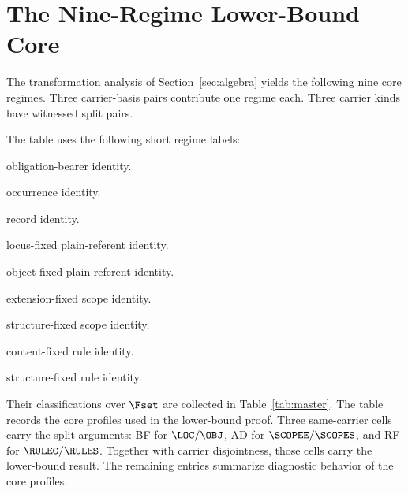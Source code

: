 
\section{The Nine-Regime Lower-Bound Core}
\label{sec:nine}

The transformation analysis of Section~\ref{sec:algebra}
yields the following nine core regimes.
Three carrier-basis pairs contribute one regime each.
Three carrier kinds have witnessed split pairs.

The table uses the following short regime labels:

\begin{description}[style=nextline,leftmargin=2.5cm]
  \item[$\OBL$] obligation-bearer identity.
  \item[$\OCC$] occurrence identity.
  \item[$\REC$] record identity.
  \item[$\LOC$] locus-fixed plain-referent identity.
  \item[$\OBJ$] object-fixed plain-referent identity.
  \item[$\SCOPEE$] extension-fixed scope identity.
  \item[$\SCOPES$] structure-fixed scope identity.
  \item[$\RULEC$] content-fixed rule identity.
  \item[$\RULES$] structure-fixed rule identity.
\end{description}

Their classifications over $\Fset$ are collected in Table~\ref{tab:master}.
The table records the core profiles used in the lower-bound proof.
Three same-carrier cells carry the split arguments:
BF for $\LOC/\OBJ$,
AD for $\SCOPEE/\SCOPES$,
and RF for $\RULEC/\RULES$.
Together with carrier disjointness, those cells carry the lower-bound result.
The remaining entries summarize diagnostic behavior of the core profiles.


